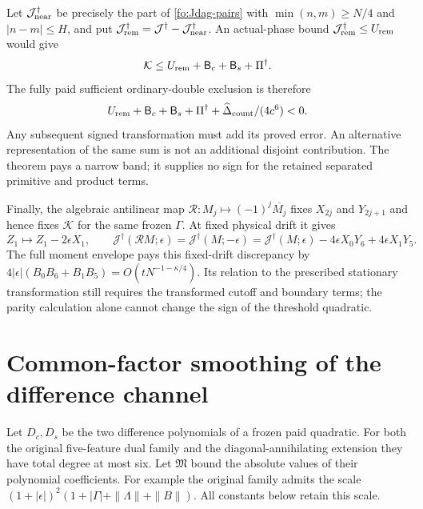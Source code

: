 \documentclass[11pt]{article}
\numberwithin{equation}{section}
\theoremstyle{definition}
\theoremstyle{remark}
\begin{document}
Let $\mathcal J^\dagger_{\rm near}$ be precisely the part of
\eqref{fo:Jdag-pairs} with $\min(n,m)\ge N/4$ and
$|n-m|\le H$, and put
$\mathcal J^\dagger_{\rm rem}=\mathcal J^\dagger-
\mathcal J^\dagger_{\rm near}$.  An actual-phase bound
$\mathcal J^\dagger_{\rm rem}\le U_{\rm rem}$ would give
\begin{equation}
\mathcal K\le U_{\rm rem}+\mathsf B_c+\mathsf B_s+\Pi^\dagger.
\end{equation}
The fully paid sufficient ordinary-double exclusion is therefore
\begin{equation}
U_{\rm rem}+\mathsf B_c+\mathsf B_s+\Pi^\dagger
                    +\widehat\Delta_{\rm count}/(4c^6)<0.
\label{fo:final-paid-target}
\end{equation}
Any subsequent signed transformation must add its proved error.
An alternative representation of the same sum is not an additional
disjoint contribution.  The theorem pays a narrow band; it supplies no
sign for the retained separated primitive and product terms.

Finally, the algebraic antilinear map
$\mathcal R:M_j\mapsto(-1)^j\overline{M_j}$ fixes $X_{2j}$ and
$Y_{2j+1}$ and hence fixes $\mathcal K$ for the same frozen
$\Gamma$.  At fixed physical drift it gives
\begin{equation}
Z_1\mapsto Z_1-2\epsilon X_1,\qquad
\mathcal J^\dagger(\mathcal RM;\epsilon)
 =\mathcal J^\dagger(M;-\epsilon)
 =\mathcal J^\dagger(M;\epsilon)
       -4\epsilon X_0Y_6+4\epsilon X_1Y_5.
\label{fo:reflection-parity}
\end{equation}
The full moment envelope pays this fixed-drift discrepancy by
$4|\epsilon|(B_0B_6+B_1B_5)=O(tN^{-1-\kappa/4})$.
Its relation to the prescribed stationary transformation still requires
the transformed cutoff and boundary terms; the parity calculation alone
cannot change the sign of the threshold quadratic.

\section{Common-factor smoothing of the difference channel}
\label{em:section}
Let $D_c,D_s$ be the two difference polynomials of a frozen paid quadratic.
For both the original five-feature dual family and the
diagonal-annihilating extension they have total degree at most six.
Let $\mathfrak M$ bound the absolute values of their polynomial
coefficients. For example the original family admits the scale
$(1+|\epsilon|)^2(1+|\Gamma|+\|\Lambda\|+\|B\|)$.
All constants below retain this scale.
\end{document}
